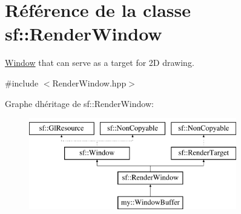 \hypertarget{classsf_1_1RenderWindow}{}\section{Référence de la classe sf\+:\+:Render\+Window}
\label{classsf_1_1RenderWindow}


\hyperlink{classsf_1_1Window}{Window} that can serve as a target for 2D drawing.  




{\ttfamily \#include $<$Render\+Window.\+hpp$>$}

Graphe d\textquotesingle{}héritage de sf\+:\+:Render\+Window\+:\begin{figure}[H]
\begin{center}
\leavevmode
\includegraphics[height=4.000000cm]{classsf_1_1RenderWindow}
\end{center}
\end{figure}
